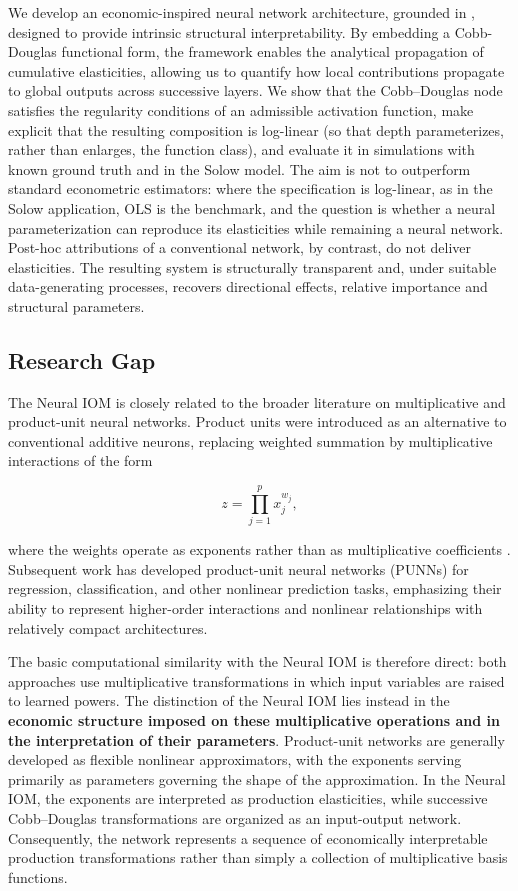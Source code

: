 \documentclass[preprint,12pt,authoryear]{sn-jnl}
\begin{document}
We develop an economic-inspired neural network architecture, grounded in \cite{leontief1986input}, designed to provide intrinsic structural interpretability. By embedding a Cobb-Douglas functional form, the framework enables the analytical propagation of cumulative elasticities, allowing us to quantify how local contributions propagate to global outputs across successive layers. We show that the Cobb--Douglas node satisfies the regularity conditions of an admissible activation function, make explicit that the resulting composition is log-linear (so that depth parameterizes, rather than enlarges, the function class), and evaluate it in simulations with known ground truth and in the Solow model. The aim is not to outperform standard econometric estimators: where the specification is log-linear, as in the Solow application, OLS is the benchmark, and the question is whether a neural parameterization can reproduce its elasticities while remaining a neural network. Post-hoc attributions of a conventional network, by contrast, do not deliver elasticities. The resulting system is structurally transparent and, under suitable data-generating processes, recovers directional effects, relative importance and structural parameters.

\subsection{Research Gap}
The Neural IOM is closely related to the broader literature on multiplicative and product-unit neural networks. Product units were introduced as an alternative to conventional additive neurons, replacing weighted summation by multiplicative interactions of the form

$$
z=\prod_{j=1}^{p}x_j^{w_j},
$$

where the weights operate as exponents rather than as multiplicative coefficients \citep{durbin1989product}. Subsequent work has developed product-unit neural networks (PUNNs) for regression, classification, and other nonlinear prediction tasks, emphasizing their ability to represent higher-order interactions and nonlinear relationships with relatively compact architectures. \citep{bas2016training}

The basic computational similarity with the Neural IOM is therefore direct: both approaches use multiplicative transformations in which input variables are raised to learned powers. The distinction of the Neural IOM lies instead in the \textbf{economic structure imposed on these multiplicative operations and in the interpretation of their parameters}. Product-unit networks are generally developed as flexible nonlinear approximators, with the exponents serving primarily as parameters governing the shape of the approximation. In the Neural IOM, the exponents are interpreted as production elasticities, while successive Cobb--Douglas transformations are organized as an input-output network. Consequently, the network represents a sequence of economically interpretable production transformations rather than simply a collection of multiplicative basis functions.
\end{document}
